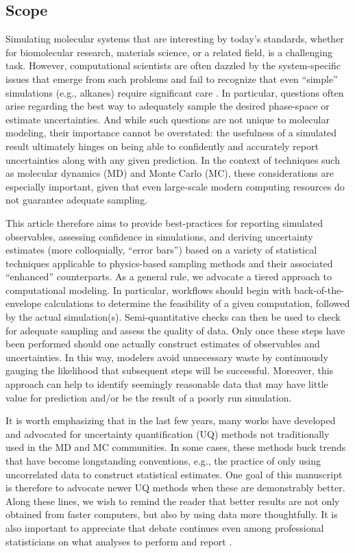 \subsection{Scope}

Simulating molecular systems that are interesting by today's standards, whether for biomolecular research, materials science, or a related field, is a challenging task.
However, computational scientists are often dazzled by the system-specific issues that emerge from such problems and fail to recognize that even ``simple'' simulations (e.g., alkanes) require significant care \cite{Schappals2017}.  In particular, questions often arise regarding the best way to adequately sample the desired phase-space or estimate uncertainties.  And while such questions are not unique to molecular modeling, their importance cannot be overstated: the usefulness of a simulated result ultimately hinges on being able to confidently and accurately report uncertainties along with any given prediction.  In the context of techniques such as molecular dynamics (MD) and Monte Carlo (MC), these considerations are especially important, given that even large-scale modern computing resources do not guarantee adequate sampling.

This article therefore aims to provide best-practices for reporting simulated observables, assessing confidence in simulations, and deriving uncertainty estimates (more colloquially, ``error bars'') based on a variety of statistical techniques applicable to physics-based sampling methods and their associated ``enhanced'' counterparts.  As a general rule, we advocate a tiered approach to computational modeling.  In particular, workflows should begin with back-of-the-envelope calculations to determine the feasibility of a given computation, followed by the actual simulation(s).  Semi-quantitative checks can then be used to check for adequate sampling and assess the quality of data.  Only once these steps have been performed should one actually construct estimates of observables and uncertainties.  In this way, modelers avoid unnecessary waste by continuously gauging the likelihood that subsequent steps will be successful.  Moreover, this approach can help to identify seemingly reasonable data that may have little value for prediction and/or be the result of a poorly run simulation.

It is worth emphasizing that in the last few years, many works have developed and advocated for uncertainty quantification (UQ) methods not traditionally used in the MD and MC communities.  In some cases, these methods buck trends that have become longstanding conventions, e.g., the practice of only using uncorrelated data to construct statistical estimates.  One goal of this manuscript is therefore to advocate newer UQ methods when these are demonstrably better.  Along these lines, we wish to remind the reader that better results are not only obtained from faster computers, but also by using data more thoughtfully.
It is also important to appreciate that debate continues even among professional statisticians on what analyses to perform and report \cite{Leek2017}.

